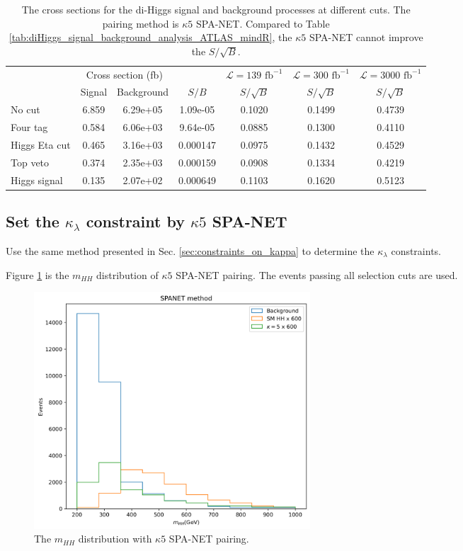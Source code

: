 \documentclass[12pt]{article}
\begin{document}
		\begin{table}[htpb]
			\centering
			\caption{The cross sections for the di-Higgs signal and background processes at different cuts. The pairing method is $\kappa 5$ SPA-NET. Compared to Table \ref{tab:diHiggs_signal_background_analysis_ATLAS_mindR}, the $\kappa 5$ SPA-NET cannot improve the $S/\sqrt{B}$.}
			\label{tab:diHiggs_signal_background_analysis_ATLAS_k5_SPANET}
			\begin{tabular}{l|cc|c|c|c|c}
							 & \multicolumn{2}{c|}{Cross section (fb)} &          & $\mathcal{L} = 139 \text{ fb}^{-1}$ & $\mathcal{L} = 300 \text{ fb}^{-1}$ & $\mathcal{L} = 3000 \text{ fb}^{-1}$ \\
							 & Signal           & Background           & $S / B$  & $S/\sqrt{B}$                        & $S/\sqrt{B}$                        & $S/\sqrt{B}$                         \\ \hline
				No cut        & 6.859 & 6.29e+05 & 1.09e-05 & 0.1020 & 0.1499 & 0.4739 \\
				Four tag      & 0.584 & 6.06e+03 & 9.64e-05 & 0.0885 & 0.1300 & 0.4110 \\
				Higgs Eta cut & 0.465 & 3.16e+03 & 0.000147 & 0.0975 & 0.1432 & 0.4529 \\
				Top veto      & 0.374 & 2.35e+03 & 0.000159 & 0.0908 & 0.1334 & 0.4219 \\
				Higgs signal  & 0.135 & 2.07e+02 & 0.000649 & 0.1103 & 0.1620 & 0.5123
			\end{tabular}
		\end{table}

	\subsection{Set the \texorpdfstring{$\kappa_\lambda$}{kappa} constraint by \texorpdfstring{$\kappa 5$}{k5} SPA-NET}%
	\label{sub:set_the_kappa_constraint_by_k5_spa_net}
		Use the same method presented in Sec. \ref{sec:constraints_on_kappa} to determine the $\kappa_\lambda$ constraints.

		Figure  \ref{fig:mhh_distribution_SPANET_k5} is the $m_{HH}$ distribution of $\kappa 5$ SPA-NET pairing. The events passing all selection cuts are used.
		\begin{figure}[htpb]
			\centering
			\includegraphics[width=0.5\textwidth]{mhh_distribution_SPANET-k5.png}
			\caption{The $m_{H H}$ distribution with $\kappa 5$ SPA-NET pairing.}
			\label{fig:mhh_distribution_SPANET_k5}
		\end{figure}
\end{document}
